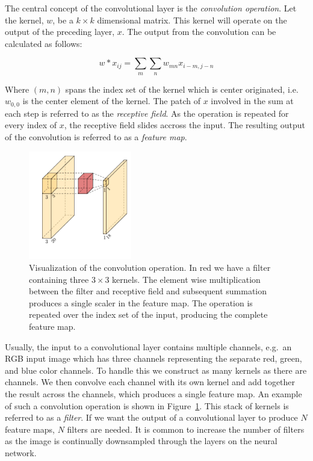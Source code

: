 The central concept of the convolutional layer is the \textit{convolution operation}.
Let the kernel, \(w\), be a \(k\times k\) dimensional matrix.
This kernel will operate on the output of the preceding layer, \(x\).
The output from the convolution can be calculated as follows:

\[w\ast x_{ij}=\sum_{m}\sum_{n}  w_{mn}x_{i-m,j-n}\]

Where \((m,n)\) spans the index set of the kernel which is center originated, i.e. \(w_{0,0}\) is the center element of the kernel.
The patch of \(x\) involved in the sum at each step is referred to as the \textit{receptive field}.
As the operation is repeated for every index of \(x\), the receptive field slides accross the input.
The resulting output of the convolution is referred to as a \textit{feature map}.

\begin{figure}[htb]
  \centering
  \includegraphics[width=0.4\textwidth]{figs/conv.pdf}
  \caption[Convolution operation]{Visualization of the convolution operation.
In red we have a filter containing three \(3\times 3\) kernels.
The element wise multiplication between the filter and receptive field and subsequent summation produces a single scaler in the feature map.
The operation is repeated over the index set of the input, producing the complete feature map.}\label{fig:cnn}
\end{figure}

Usually, the input to a convolutional layer contains multiple channels, e.g.\ an RGB input image which has three channels representing the separate  red, green, and blue color channels.
To handle this we construct as many kernels as there are channels.
We then convolve each channel with its own kernel and add together the result across the channels, which produces a single feature map.
An example of such a convolution operation is shown in Figure~\ref{fig:cnn}.
This stack of kernels is referred to as a \textit{filter}.
If we want the output of a convolutional layer to produce \(N\) feature maps, \(N\) filters are needed.  It is common to increase the number of filters as the image is continually downsampled through the layers on the neural network.

